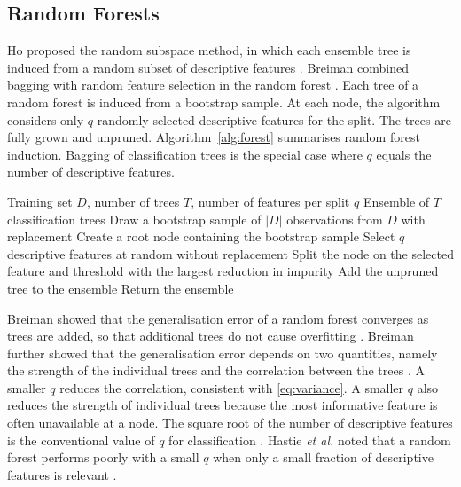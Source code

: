 \documentclass[conference]{IEEEtran}
\begin{document}
\subsection{Random Forests}

Ho proposed the random subspace method, in which each ensemble tree is induced from a random subset of descriptive features \cite{ho}. Breiman combined bagging with random feature selection in the random forest \cite{breiman2001}. Each tree of a random forest is induced from a bootstrap sample. At each node, the algorithm considers only $q$ randomly selected descriptive features for the split. The trees are fully grown and unpruned. Algorithm~\ref{alg:forest} summarises random forest induction. Bagging of classification trees is the special case where $q$ equals the number of descriptive features.

\begin{algorithm}[!t]
\caption{Random forest induction}
\label{alg:forest}
\begin{algorithmic}[1]
\REQUIRE Training set $D$, number of trees $T$, number of features per split $q$
\ENSURE Ensemble of $T$ classification trees
\STATE Draw a bootstrap sample of $|D|$ observations from $D$ with replacement
\STATE Create a root node containing the bootstrap sample
\STATE Select $q$ descriptive features at random without replacement
\STATE Split the node on the selected feature and threshold with the largest reduction in impurity
\ENDWHILE
\STATE Add the unpruned tree to the ensemble
\ENDFOR
\STATE Return the ensemble
\end{algorithmic}
\end{algorithm}

Breiman showed that the generalisation error of a random forest converges as trees are added, so that additional trees do not cause overfitting \cite{breiman2001}. Breiman further showed that the generalisation error depends on two quantities, namely the strength of the individual trees and the correlation between the trees \cite{breiman2001}. A smaller $q$ reduces the correlation, consistent with \eqref{eq:variance}. A smaller $q$ also reduces the strength of individual trees because the most informative feature is often unavailable at a node. The square root of the number of descriptive features is the conventional value of $q$ for classification \cite{hastie}. Hastie \textit{et al.} noted that a random forest performs poorly with a small $q$ when only a small fraction of descriptive features is relevant \cite{hastie}.
\end{document}
